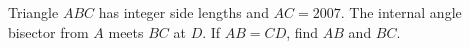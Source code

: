 Triangle $ABC$ has integer side lengths and $AC=2007$. The internal angle bisector from $A$ meets $BC$ at $D$. If $AB=CD$, find $AB$ and $BC$.

